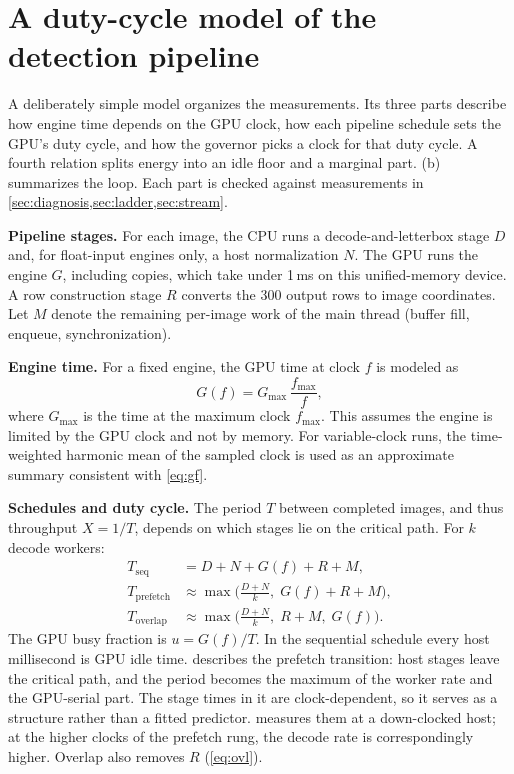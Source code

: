 \section{A duty-cycle model of the detection pipeline}
\label{sec:sysmodel}

A deliberately simple model organizes the measurements. Its three
parts describe how engine time depends on the GPU clock, how each
pipeline schedule sets the GPU's duty cycle, and how the governor picks
a clock for that duty cycle. A fourth relation splits energy into an
idle floor and a marginal part. (b) summarizes the loop. Each part is checked
against measurements in \cref{sec:diagnosis,sec:ladder,sec:stream}.

\textbf{Pipeline stages.}
For each image, the CPU runs a decode-and-letterbox stage $D$ and,
for float-input engines only, a host normalization $N$. The GPU runs
the engine $G$, including copies, which take under 1\,ms on this
unified-memory device. A row construction stage $R$ converts the $300$
output rows to image coordinates. Let $M$ denote the remaining
per-image work of the main thread (buffer fill, enqueue, synchronization).

\textbf{Engine time.}
For a fixed engine, the GPU time at clock $f$ is modeled as
\begin{equation}
  G(f) = G_{\max}\,\frac{f_{\max}}{f},
  \label{eq:gf}
\end{equation}
where $G_{\max}$ is the time at the maximum clock $f_{\max}$. This
assumes the engine is limited by the GPU clock and not by memory. For
variable-clock runs, the time-weighted harmonic mean of the sampled
clock is used as an approximate summary consistent with \cref{eq:gf}.

\textbf{Schedules and duty cycle.}
The period $T$ between completed images, and thus throughput
$X = 1/T$, depends on which stages lie on the critical path. For
$k$ decode workers:
\begin{align}
  T_{\text{seq}} &= D + N + G(f) + R + M, \label{eq:seq}\\
  T_{\text{prefetch}} &\approx \max\!\big(\tfrac{D+N}{k},\; G(f) + R + M\big), \label{eq:pre}\\
  T_{\text{overlap}} &\approx \max\!\big(\tfrac{D+N}{k},\; R + M,\; G(f)\big). \label{eq:ovl}
\end{align}
The GPU busy fraction is $u = G(f)/T$. In the sequential schedule every
host millisecond is GPU idle time.  describes the prefetch
transition: host stages leave the critical path, and the
period becomes the maximum of the worker rate and the GPU-serial part.
The stage times in it are clock-dependent, so it serves as a structure
rather than a fitted predictor.  measures them at a
down-clocked host; at the higher clocks of the prefetch rung, the
decode rate is correspondingly higher. Overlap also removes $R$
(\cref{eq:ovl}).

